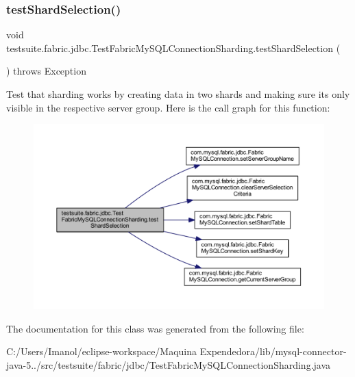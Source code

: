 \subsubsection{\texorpdfstring{test\+Shard\+Selection()}{testShardSelection()}}
{\footnotesize\ttfamily void testsuite.\+fabric.\+jdbc.\+Test\+Fabric\+My\+S\+Q\+L\+Connection\+Sharding.\+test\+Shard\+Selection (\begin{DoxyParamCaption}{ }\end{DoxyParamCaption}) throws Exception}

Test that sharding works by creating data in two shards and making sure it\textquotesingle{}s only visible in the respective server group. Here is the call graph for this function\+:
\nopagebreak
\begin{figure}[H]
\begin{center}
\leavevmode
\includegraphics[width=350pt]{classtestsuite_1_1fabric_1_1jdbc_1_1_test_fabric_my_s_q_l_connection_sharding_a98edb15acffc84d83916971697b7a3b2_cgraph}
\end{center}
\end{figure}


The documentation for this class was generated from the following file\+:\begin{DoxyCompactItemize}
\item 
C\+:/\+Users/\+Imanol/eclipse-\/workspace/\+Maquina Expendedora/lib/mysql-\/connector-\/java-\/5../src/testsuite/fabric/jdbc/Test\+Fabric\+My\+S\+Q\+L\+Connection\+Sharding.\+java\end{DoxyCompactItemize}
